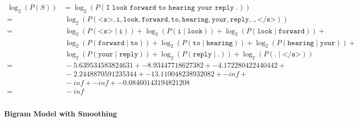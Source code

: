 \documentclass{article}
\begin{document}
\begin{equation}
\begin{split}
\log_{2} (P(S)) &= \log_{2} (P(\texttt{I look forward to hearing your reply .})) \\ =&\ \log_{2} (P(\texttt{<s>}, \texttt{i}, \texttt{look}, \texttt{forward}, \texttt{to}, \texttt{hearing}, \texttt{your}, \texttt{reply}, \texttt{.}, \texttt{</s>})) \\ =&\ \log_{2} (P(\texttt{<s>} \mid \texttt{i})) + \log_{2} (P(\texttt{i} \mid \texttt{look})) + \log_{2} (P(\texttt{look} \mid \texttt{forward})) + \\ &\ \log_{2} (P(\texttt{forward} \mid \texttt{to})) + \log_{2} (P(\texttt{to} \mid \texttt{hearing})) + \log_{2} (P(\texttt{hearing} \mid \texttt{your})) + \\ &\ \log_{2} (P(\texttt{your} \mid \texttt{reply})) + \log_{2} (P(\texttt{reply} \mid \texttt{.})) + \log_{2} (P(\texttt{.} \mid \texttt{</s>})) \\ =&\ -5.639534583824631 + -8.93447718627382 + -4.172280422440442 + \\ &\ -2.2448870591235344 + -13.110048238932082 + -inf + \\ &\ -inf + -inf + -0.08460143194821208 \\ =&\ -inf \\
\end{split}\end{equation}

\paragraph{Bigram Model with Smoothing}
\end{document}
